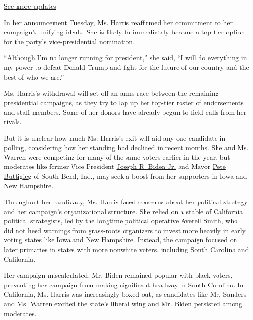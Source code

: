 \href{https://www.nytimes.com/2020/07/31/us/elections/biden-vs-trump.html?action=click\&pgtype=Article\&state=default\&region=MAIN_CONTENT_1\&context=storylines_live_updates}{See
more updates}

In her announcement Tuesday, Ms. Harris reaffirmed her commitment to her
campaign's unifying ideals. She is likely to immediately become a
top-tier option for the party's vice-presidential nomination.

``Although I'm no longer running for president,'' she said, ``I will do
everything in my power to defeat Donald Trump and fight for the future
of our country and the best of who we are.''

Ms. Harris's withdrawal will set off an arms race between the remaining
presidential campaigns, as they try to lap up her top-tier roster of
endorsements and staff members. Some of her donors have already begun to
field calls from her rivals.

But it is unclear how much Ms. Harris's exit will aid any one candidate
in polling, considering how her standing had declined in recent months.
She and Ms. Warren were competing for many of the same voters earlier in
the year, but moderates like former Vice President
\href{https://www.nytimes.com/interactive/2020/us/elections/joe-biden.html}{Joseph
R. Biden Jr.} and Mayor
\href{https://www.nytimes.com/interactive/2020/us/elections/pete-buttigieg.html}{Pete
Buttigieg} of South Bend, Ind., may seek a boost from her supporters in
Iowa and New Hampshire.

Throughout her candidacy, Ms. Harris faced concerns about her political
strategy and her campaign's organizational structure. She relied on a
stable of California political strategists, led by the longtime
political operative Averell Smith, who did not heed warnings from
grass-roots organizers to invest more heavily in early voting states
like Iowa and New Hampshire. Instead, the campaign focused on later
primaries in states with more nonwhite voters, including South Carolina
and California.

Her campaign miscalculated. Mr. Biden remained popular with black
voters, preventing her campaign from making significant headway in South
Carolina. In California, Ms. Harris was increasingly boxed out, as
candidates like Mr. Sanders and Ms. Warren excited the state's liberal
wing and Mr. Biden persisted among moderates.

\href{https://www.nytimes.com/interactive/2019/us/politics/2020-presidential-candidates.html}{}

